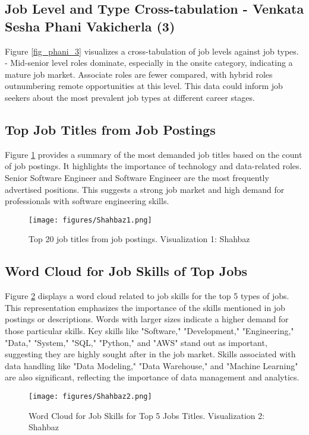 \documentclass[a4paper,10pt]{article}
\begin{document}
\subsection{Job Level and Type Cross-tabulation - Venkata Sesha Phani Vakicherla (3)}
Figure \ref{fig_phani_3} visualizes a cross-tabulation of job levels against job types. - Mid-senior level roles dominate, especially in the onsite category, indicating a mature job market.
Associate roles are fewer compared, with hybrid roles outnumbering remote opportunities at this level. This data could inform job seekers about the most prevalent job types at different career stages.


\subsection{Top Job Titles from Job Postings}
Figure \ref{fig_shabaz1} provides a summary of the most demanded job titles based on the count of job postings. It highlights the importance of technology and data-related roles. Senior Software Engineer and Software Engineer are the most frequently advertised positions. This suggests a strong job market and high demand for professionals with software engineering skills.

    \begin{figure}[ht]
    \centering
    \texttt{[image: figures/Shahbaz1.png]}
    \caption{Top 20 job titles from job postings. Visualization 1: Shahbaz}
    \label{fig_shabaz1}
    \end{figure}

\subsection{Word Cloud for Job Skills of Top Jobs}
Figure \ref{fig_shabaz2} displays a word cloud related to job skills for the top 5 types of jobs. This representation emphasizes the importance of the skills mentioned in job postings or descriptions. Words with larger sizes indicate a higher demand for those particular skills. Key skills like "Software," "Development," "Engineering," "Data," "System," "SQL," "Python," and "AWS" stand out as important, suggesting they are highly sought after in the job market. Skills associated with data handling like "Data Modeling," "Data Warehouse," and "Machine Learning" are also significant, reflecting the importance of data management and analytics. 

    \begin{figure}[ht]
    \centering
    \texttt{[image: figures/Shahbaz2.png]}
    \caption{Word Cloud for Job Skills for Top 5 Jobs Titles. Visualization 2: Shahbaz}
    \label{fig_shabaz2}
    \end{figure}
\end{document}
